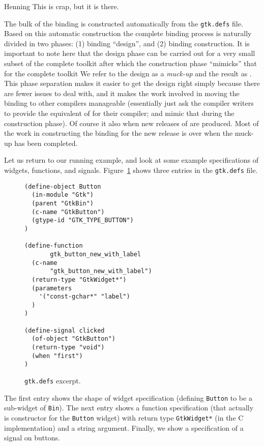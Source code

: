 \documentclass[workingdraft,endnotes]{usetex-v1}
\begin{document}
\begin{ednote}{Henning} This is crap, but it is there. \end{ednote}

The bulk of the \mgtk binding is constructed automatically from the
\texttt{gtk.defs} file. Based on this automatic construction the
complete binding process is naturally divided in two phases: (1)
binding ``design'', and (2) binding construction. It is important to
note here that the design phase can be carried out for a very small
subset of the complete toolkit after which the construction phase
``mimicks'' that for the complete toolkit We refer to the design as a
\emph{muck-up} and the result as \minimgtk. This phase separation
makes it easier to get the design right simply because there are fewer
issues to deal with, and it makes the work involved in moving the
binding to other \sml compilers manageable (essentially just ask the
compiler writers to provide the equivalent of \minimgtk for their
compiler; and mimic that during the construction phase). Of course it
also when new releases of \gtk are produced. Most of the work in
constructing the binding for the new release is over when the muck-up
has been completed.

Let us return to our running example, and look at some example
specifications of widgets, functions, and signals. Figure~\ref{fig:gtk-defs}
shows three entries in the \texttt{gtk.defs} file.
\begin{figure}[htbp]
\begin{centering}
\begin{verbatim}
(define-object Button
  (in-module "Gtk")
  (parent "GtkBin")
  (c-name "GtkButton")
  (gtype-id "GTK_TYPE_BUTTON")
)

(define-function 
       gtk_button_new_with_label
  (c-name 
       "gtk_button_new_with_label")
  (return-type "GtkWidget*")
  (parameters
    '("const-gchar*" "label")
  )
)

(define-signal clicked
  (of-object "GtkButton")
  (return-type "void")
  (when "first")
)
\end{verbatim}
\caption{\texttt{gtk.defs} excerpt.\label{fig:gtk-defs}}
\end{centering}
\end{figure}
The first entry shows the shape of widget specification (defining
\texttt{Button} to be a sub-widget of \texttt{Bin}). The next entry
shows a function specification (that actually is constructor for the
\texttt{Button} widget) with return type \texttt{GtkWidget*} (in the C
implementation) and a string argument. Finally, we show a specification
of a signal on buttons.
\end{document}
